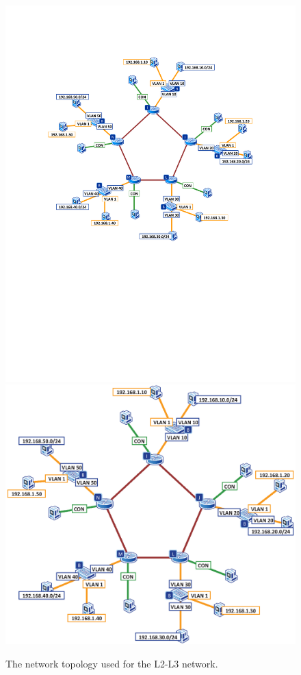 \begin{figure}
\centering
\ifpdf
\includegraphics[width=0.9\linewidth]{Figures/RoutingSwitches.pdf}
\else
\includegraphics[width=0.9\linewidth]{Figures/RoutingSwitches.eps}
\fi
\caption{The network topology used for the L2-L3 network.}
\label{fig:RoutingSwitches}
\end{figure}

